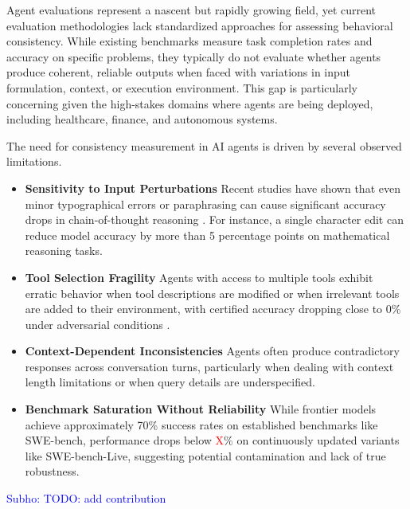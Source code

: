 \documentclass{article}
\newcommand{\red}[1]{\textcolor{red}}
\newcommand{\sm}[1]{\textcolor{blue}{Subho: #1}}
\theoremstyle{plain}
\theoremstyle{definition}
\theoremstyle{remark}
\begin{document}
Agent evaluations represent a nascent but rapidly growing field, yet current evaluation methodologies lack standardized approaches for assessing behavioral consistency. While existing benchmarks measure task completion rates and accuracy on specific problems, they typically do not evaluate whether agents produce coherent, reliable outputs when faced with variations in input formulation, context, or execution environment. This gap is particularly concerning given the high-stakes domains where agents are being deployed, including healthcare, finance, and autonomous systems.

The need for consistency measurement in AI agents is driven by several observed limitations.

\begin{itemize}[leftmargin=*,nolistsep]
    \item \textbf{Sensitivity to Input Perturbations} Recent studies have shown that even minor typographical errors or paraphrasing can cause significant accuracy drops in chain-of-thought reasoning \cite{gan2024r2ata, zhu2023promptrobust}. For instance, a single character edit can reduce model accuracy by more than 5 percentage points on mathematical reasoning tasks.
    
    \item \textbf{Tool Selection Fragility} Agents with access to multiple tools exhibit erratic behavior when tool descriptions are modified or when irrelevant tools are added to their environment, with certified accuracy dropping close to 0\% under adversarial conditions \cite{huang2024cats}.
    
    \item \textbf{Context-Dependent Inconsistencies} Agents often produce contradictory responses across conversation turns, particularly when dealing with context length limitations or when query details are underspecified.
    
    \item \textbf{Benchmark Saturation Without Reliability} While frontier models achieve approximately 70\% success rates on established benchmarks like SWE-bench, performance drops below {\red XX}\% on continuously updated variants like SWE-bench-Live, suggesting potential contamination and lack of true robustness.
\end{itemize}


\sm{TODO: add contribution}

    
\end{document}
